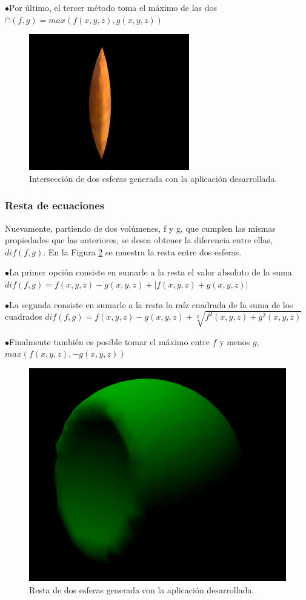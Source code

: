 \documentclass[12pt]{article}
\begin{document}
$\bullet$Por último, el tercer método toma el máximo de las dos   $\cap(f,g)= max(f(x,y,z) , g(x,y,z))$
\begin{figure}[h!]
\includegraphics[width=0.6\linewidth,center]{oi2.png}
\caption{Intersección de dos esferas generada con la aplicación desarrollada.}
\label{inter}
\end{figure}

\subsubsection{Resta de ecuaciones}
\noindent Nuevamente, partiendo de dos volúmenes, f y g, que cumplen las mismas propiedades que las anteriores, se desea obtener la diferencia entre ellas, $dif(f,g)$. En la Figura \ref{resta} se muestra la resta entre dos esferas.

$\bullet$La primer opción consiste en sumarle a la resta el valor absoluto de la suma $dif(f,g) = f(x,y,z) - g(x,y,z) + |f(x,y,z) + g(x,y,z)|$

$\bullet$La segunda consiste en sumarle a la resta la raíz cuadrada de la suma de los cuadrados $dif(f,g) = f(x,y,z) - g(x,y,z) + \sqrt[2]{f^2(x,y,z) + g^2(x,y,z)}$ 

$\bullet$Finalmente también es posible tomar el máximo entre $f$ y menos $g$, $max(f(x,y,z),-g(x,y,z))$
\begin{figure}[h!]
\includegraphics[width=0.6\linewidth,center]{oi3.png}
\caption{Resta de dos esferas generada con la aplicación desarrollada.}
\label{resta}
\end{figure}
\end{document}
